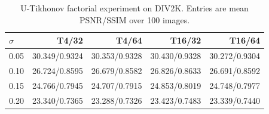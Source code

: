 \begin{table}[htbp]
\centering
\caption{U-Tikhonov factorial experiment on DIV2K. Entries are mean PSNR/SSIM over 100 images.}
\label{tab:u_tikhonov_2x2_div2k}
\begin{tabular}{lrrrr}
\toprule
$\sigma$ & T4/32 & T4/64 & T16/32 & T16/64 \\
\midrule
0.05 & 30.349/0.9324 & 30.353/0.9328 & 30.430/0.9328 & 30.272/0.9304 \\
0.10 & 26.724/0.8595 & 26.679/0.8582 & 26.826/0.8633 & 26.691/0.8592 \\
0.15 & 24.766/0.7945 & 24.707/0.7915 & 24.853/0.8019 & 24.748/0.7977 \\
0.20 & 23.340/0.7365 & 23.288/0.7326 & 23.423/0.7483 & 23.339/0.7440 \\
\bottomrule
\end{tabular}
\end{table}
